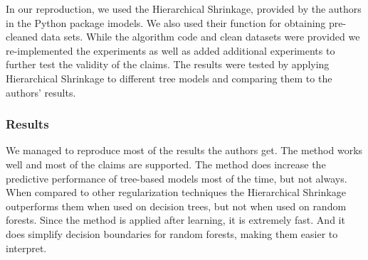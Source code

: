 In our reproduction, we used the Hierarchical Shrinkage, provided by the authors in the Python package {\sf imodels}. We also used their function for obtaining pre-cleaned data sets. While the algorithm code and clean datasets were provided we re-implemented the experiments as well as added additional experiments to further test the validity of the claims. The results were tested by applying Hierarchical Shrinkage to different tree models and comparing them to the authors' results.

\subsubsection*{Results}


We managed to reproduce most of the results the authors get. 
The method works well and most of the claims are supported. The method does increase the predictive performance of tree-based models most of the time, but not always. When compared to other regularization techniques the Hierarchical Shrinkage outperforms them when used on decision trees, but not when used on random forests. Since the method is applied after learning, it is extremely fast. And it does simplify decision boundaries for random forests, making them easier to interpret.

